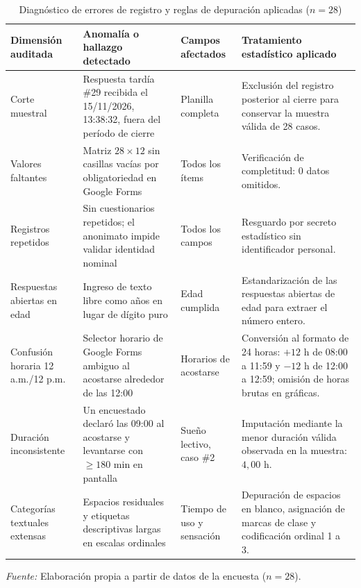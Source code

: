 \documentclass[12pt, letterpaper]{article}
\begin{document}
\begin{table}[H]
\centering
\caption{Diagnóstico de errores de registro y reglas de depuración aplicadas \mbox{($n = 28$)}}
\label{tab:a1}
\scriptsize
\begin{tabularx}{\textwidth}{>{\raggedright\arraybackslash}p{2.7cm}>{\raggedright\arraybackslash}p{4.3cm}>{\raggedright\arraybackslash}p{2.5cm}>{\raggedright\arraybackslash}X}
\toprule
\textbf{Dimensión auditada} & \textbf{Anomalía o hallazgo detectado} & \textbf{Campos afectados} & \textbf{Tratamiento estadístico aplicado} \\
\midrule
Corte muestral & Respuesta tardía \#29 recibida el 15/11/2026, 13:38:32, fuera del período de cierre & Planilla completa & Exclusión del registro posterior al cierre para conservar la muestra válida de 28 casos. \\
\addlinespace
Valores faltantes & Matriz $28 \times 12$ sin casillas vacías por obligatoriedad en Google Forms & Todos los ítems & Verificación de completitud: 0 datos omitidos. \\
\addlinespace
Registros repetidos & Sin cuestionarios repetidos; el anonimato impide validar identidad nominal & Todos los campos & Resguardo por secreto estadístico sin identificador personal. \\
\addlinespace
Respuestas abiertas en edad & Ingreso de texto libre como \guillemotleft 20 años\guillemotright{} en lugar de dígito puro & Edad cumplida & Estandarización de las respuestas abiertas de edad para extraer el número entero. \\
\addlinespace
Confusión horaria 12 a.m./12 p.m. & Selector horario de Google Forms ambiguo al acostarse alrededor de las 12:00 & Horarios de acostarse & Conversión al formato de 24 horas: $+12\text{ h}$ de 08:00 a 11:59 y $-12\text{ h}$ de 12:00 a 12:59; omisión de horas brutas en gráficas. \\
\addlinespace
Duración inconsistente & Un encuestado declaró las 09:00 al acostarse y levantarse con $\ge 180\text{ min}$ en pantalla & Sueño lectivo, caso \#2 & Imputación mediante la menor duración válida observada en la muestra: $4{,}00\text{ h}$. \\
\addlinespace
Categorías textuales extensas & Espacios residuales y etiquetas descriptivas largas en escalas ordinales & Tiempo de uso y sensación & Depuración de espacios en blanco, asignación de marcas de clase y codificación ordinal 1 a 3. \\
\bottomrule
\end{tabularx}
\par\smallskip\parbox{\textwidth}{\footnotesize\textit{Fuente:} Elaboración propia a partir de datos de la encuesta ($n = 28$).}
\end{table}
\end{document}
